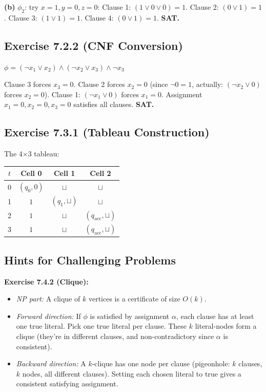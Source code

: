 \documentclass[12pt,a4paper]{article}
\begin{document}
\noindent\textbf{(b)} $\phi_2$: try $x = 1, y = 0, z = 0$:
Clause 1: $(1 \lor 0 \lor 0)=1$. Clause 2: $(0 \lor 1)=1$. Clause 3: $(1 \lor 1)=1$. 
Clause 4: $(0 \lor 1)=1$. \textbf{SAT.}

\subsection*{Exercise 7.2.2 (CNF Conversion)}
$\phi = (\neg x_1 \lor x_2) \land (\neg x_2 \lor x_3) \land \neg x_3$

Clause 3 forces $x_3 = 0$. Clause 2 forces $x_2 = 0$ (since $\neg 0 = 1$, actually: 
$(\neg x_2 \lor 0)$ forces $x_2 = 0$). Clause 1: $(\neg x_1 \lor 0)$ forces $x_1 = 0$. 
Assignment $x_1=0, x_2=0, x_3=0$ satisfies all clauses. \textbf{SAT.}

\subsection*{Exercise 7.3.1 (Tableau Construction)}
The 4$\times$3 tableau:
\begin{center}
\begin{tabular}{c|ccc}
\toprule
$t$ & Cell 0 & Cell 1 & Cell 2 \\
\midrule
0 & $(q_0,0)$ & $\sqcup$ & $\sqcup$ \\
1 & $1$ & $(q_1,\sqcup)$ & $\sqcup$ \\
2 & $1$ & $\sqcup$ & $(q_\text{acc},\sqcup)$ \\
3 & $1$ & $\sqcup$ & $(q_\text{acc},\sqcup)$ \\
\bottomrule
\end{tabular}
\end{center}

\subsection*{Hints for Challenging Problems}

\textbf{Exercise 7.4.2 (Clique):}
\begin{itemize}[leftmargin=2em]
  \item \textit{NP part:} A clique of $k$ vertices is a certificate of size $O(k)$.
  \item \textit{Forward direction:} If $\phi$ is satisfied by assignment $\alpha$, each clause 
    has at least one true literal. Pick one true literal per clause. These $k$ literal-nodes 
    form a clique (they're in different clauses, and non-contradictory since $\alpha$ is consistent).
  \item \textit{Backward direction:} A $k$-clique has one node per clause (pigeonhole: $k$ clauses, 
    $k$ nodes, all different clauses). Setting each chosen literal to true gives a consistent 
    satisfying assignment.
\end{itemize}
\end{document}
